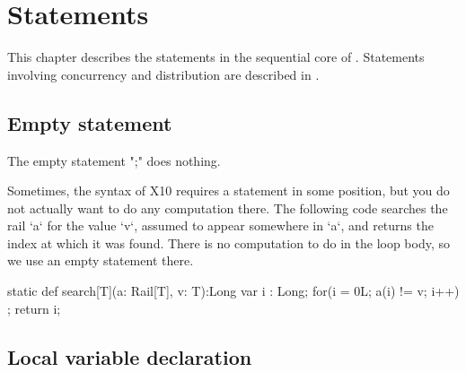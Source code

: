 \chapter{Statements}\label{XtenStatements}

This chapter describes the statements in the sequential core of
\Xten{}.  Statements involving concurrency and distribution
are described in .

\section{Empty statement}

The empty statement \xcd";" does nothing.  

\begin{ex}
Sometimes, the syntax of X10 requires a statement in some position, but you do
not actually want to do any computation there.   
The following code searches the rail \xcd`a` for the value \xcd`v`, assumed
to appear somewhere in \xcd`a`, and returns the index at which it was found.  
There is no computation to do in the loop body, so we use an empty statement
there. 
\begin{xten}
static def search[T](a: Rail[T], v: T):Long {
  var i : Long;
  for(i = 0L; a(i) != v; i++)
     ;
  return i;
}
\end{xten}

\end{ex}

\section{Local variable declaration}
\label{sect:LocalVarDecln}

